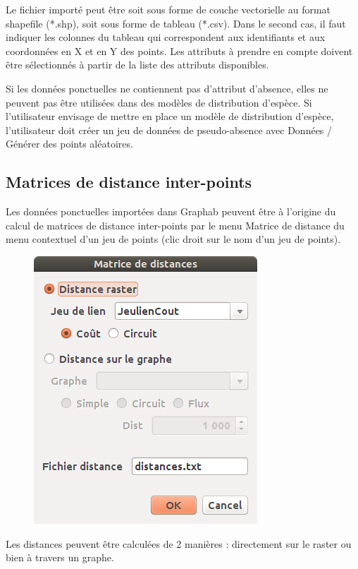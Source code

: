 \documentclass{article}
\begin{document}
Le fichier importé peut être soit sous forme de couche vectorielle au format shapefile (*.shp), soit sous forme de tableau (*.csv). Dans le second cas, il faut indiquer les colonnes du tableau qui correspondent aux identifiants et aux coordonnées en X et en Y des points. Les attributs à prendre en compte doivent être sélectionnés à partir de la liste des attributs disponibles.

Si les données ponctuelles ne contiennent pas d’attribut d’absence, elles ne peuvent pas être utilisées dans des modèles de distribution d’espèce. Si l’utilisateur envisage de mettre en place un modèle de distribution d’espèce, l’utilisateur doit créer un jeu de données de pseudo-absence avec Données / Générer des points aléatoires.

\subsection{Matrices de distance inter-points}

Les données ponctuelles importées dans Graphab peuvent être à l’origine du calcul de matrices de distance inter-points par le menu Matrice de distance du menu contextuel d'un jeu de points (clic droit sur le nom d’un jeu de points).

\begin{figure}[H]
	\includegraphics[scale=0.5]{img/manual-fr_img13b.png} 
\end{figure}

Les distances peuvent être calculées de 2 manières : directement sur le raster ou bien à travers un graphe.
\end{document}
